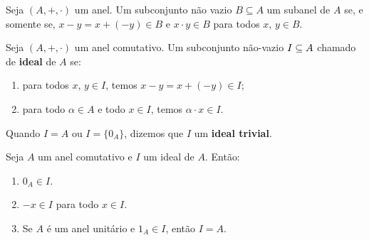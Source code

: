 \documentclass{beamer}
\begin{document}
    \begin{frame}
        \begin{proposicao}
            Seja $(A, +,\cdot)$ um anel. \pause Um subconjunto n{\~a}o vazio \pause $B\subseteq A$  um subanel de $A$ \pause se, e somente se, \pause $x - y = x + (-y) \in B$ \pause e $x\cdot y \in B$ \pause para todos $x$, $y \in B$.\pause
        \end{proposicao}
    \end{frame}

    \begin{frame}
        \begin{definicao}
            Seja $(A, +, \cdot)$ um anel comutativo. \pause Um subconjunto n\~ao-vazio \pause $I \subseteq A$  chamado de \textbf{ideal} \pause de $A$ se:\pause
            \begin{enumerate}[label={\roman*})]
                \item para todos $x$, $y \in I$, \pause temos $x - y = x + (-y) \in I$;\pause
                \item para todo $\alpha \in A$ \pause e todo $x \in I$, \pause temos $\alpha\cdot x \in I$.\pause
            \end{enumerate}
        \end{definicao}

        \begin{observacao}
            Quando $I = A$ \pause ou $I = \{0_A\}$, \pause dizemos que $I$  um \textbf{ideal trivial}.\pause
        \end{observacao}
    \end{frame}

    \begin{frame}
        \begin{proposicao}
            Seja $A$ um anel comutativo \pause e $I$ um ideal de $A$. \pause Ent{\~a}o:\pause
            \begin{enumerate}[label={\roman*})]
                \item $0_{A}\in I$.\pause
                \item $-x \in I$ \pause para todo $x \in I$.\pause
                \item Se $A$ é um anel unitário e $1_A \in I$, \pause ent\~ao $I = A$.\pause
            \end{enumerate}
        \end{proposicao}
    \end{frame}
\end{document}
